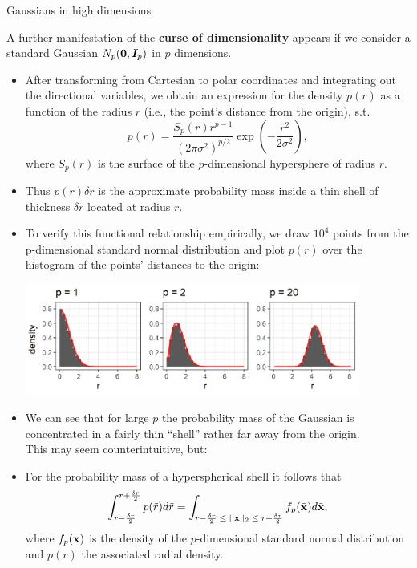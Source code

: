 \begin{vbframe}{Gaussians in high dimensions}

A further manifestation of the \textbf{curse of dimensionality} appears if we consider a standard Gaussian $N_p(\bm{0}, \boldsymbol{I}_p)$ in $p$ dimensions.

\begin{itemize}
    \item After transforming from Cartesian to polar coordinates and integrating out the directional variables, we obtain an expression for the density $p(r)$ as a function of the radius $r$ (i.e., the point's distance from the origin), s.t.
    $$ p(r) = \frac{S_p(r)r^{p-1}}{(2 \pi \sigma^2)^{p/2}} \exp \left( -\frac{r^2}{2\sigma^2}\right),$$
    where $S_p(r)$ is the surface of the $p$-dimensional hypersphere of radius $r$.
    \item Thus $p(r) \delta r$ is the approximate probability mass inside a thin shell of thickness $\delta r$ located at radius $r$. 
    
  
\framebreak 
\item To verify this functional relationship empirically, we draw $10^4$ points from the p-dimensional standard normal distribution and plot $p(r)$ over the histogram of the points' distances to the origin:

\begin{center}
\includegraphics[width = 11cm ]{figure/gauss_high_dim_hist_plot.png}
\end{center}

\item We can see that for large $p$ the probability mass of the Gaussian is concentrated in a fairly thin \enquote{shell} rather far away from the origin. \\
This may seem counterintuitive, but:

\framebreak

  \item For the probability mass of a hyperspherical shell it follows that
    $$\int^{r + \frac{\delta r}{2}}_{r - \frac{\delta r}{2}}p(\tilde{r})d\tilde{r} = \int_{r - \frac{\delta r}{2} \; \leq \; ||\mathbf{x}||_2 \; \leq \; r + \frac{\delta r}{2}} f_p(\tilde{\mathbf{x}}) d\tilde{\mathbf{x}},$$
    where $f_p(\mathbf{x})$ is the density of the $p$-dimensional standard normal distribution and $p(r)$ the associated radial density.


\end{itemize}
\end{vbframe}
